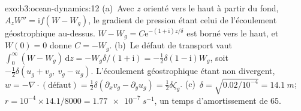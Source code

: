 \begin{solution}{exo:b3:ocean-dynamics:12}
(a)~Avec $z$ orienté vers le haut à partir du fond, $A_zW'' = \mathrm if(W - W_g)$, le
gradient de pression étant celui de l'écoulement géostrophique au-dessus. $W - W_g =
C\mathrm e^{-(1+\mathrm i)z/\delta}$ est borné vers le haut, et $W(0) = 0$ donne
$C = -W_g$. (b)~Le défaut de transport vaut $\int_0^\infty(W - W_g)\,\mathrm dz
= -W_g\delta/(1+\mathrm i) = -\tfrac12\delta(1 - \mathrm i)W_g$, soit
$-\tfrac12\delta(u_g + v_g,\ v_g - u_g)$. L'écoulement géostrophique étant
non divergent, $w = -\nabla\cdot(\text{défaut}) = \tfrac12\delta(\partial_x
v_g - \partial_y u_g) = \tfrac12\delta\zeta_g$. (c)~$\delta =
\sqrt{0.02/10^{-4}} = \qty{14.1}{m}$; $r = 10^{-4}\times14.1/8000 =
\qty{1.77e-7}{s^{-1}}$, un temps d'amortissement de \num{65}.
\end{solution}

